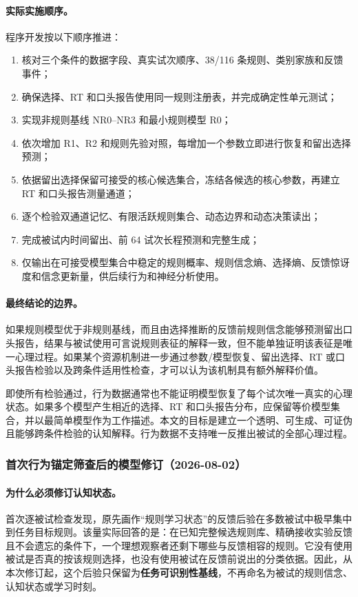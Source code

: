 \paragraph{实际实施顺序。}
程序开发按以下顺序推进：
\begin{enumerate}
    \item 核对三个条件的数据字段、真实试次顺序、38/116 条规则、类别家族和反馈事件；
    \item 确保选择、RT 和口头报告使用同一规则注册表，并完成确定性单元测试；
    \item 实现非规则基线 NR0--NR3 和最小规则模型 R0；
    \item 依次增加 R1、R2 和规则先验对照，每增加一个参数立即进行恢复和留出选择预测；
    \item 依据留出选择保留可接受的核心候选集合，冻结各候选的核心参数，再建立 RT 和口头报告测量通道；
    \item 逐个检验双通道记忆、有限活跃规则集合、动态边界和动态决策读出；
    \item 完成被试内时间留出、前 64 试次长程预测和完整生成；
    \item 仅输出在可接受模型集合中稳定的规则概率、规则信念熵、选择熵、反馈惊讶度和信念更新量，供后续行为和神经分析使用。
\end{enumerate}

\paragraph{最终结论的边界。}
如果规则模型优于非规则基线，而且由选择推断的反馈前规则信念能够预测留出口头报告，结果与被试使用可言说规则表征的解释一致，但不能单独证明该表征是唯一心理过程。如果某个资源机制进一步通过参数/模型恢复、留出选择、RT 或口头报告检验以及跨条件适用性检查，才可以认为该机制具有额外解释价值。

即使所有检验通过，行为数据通常也不能证明模型恢复了每个试次唯一真实的心理状态。如果多个模型产生相近的选择、RT 和口头报告分布，应保留等价模型集合，并以最简单模型作为工作描述。本文的目标是建立一个透明、可生成、可证伪且能够跨条件检验的认知解释。行为数据不支持唯一反推出被试的全部心理过程。


\subsubsection{首次行为锚定筛查后的模型修订（2026-08-02）}

\paragraph{为什么必须修订认知状态。}
首次逐被试检查发现，原先画作“规则学习状态”的反馈后验在多数被试中极早集中到任务目标规则。该量实际回答的是：在已知完整候选规则库、精确接收实验反馈且不会遗忘的条件下，一个理想观察者还剩下哪些与反馈相容的规则。它没有使用被试是否真的按该规则选择，也没有使用被试在反馈前说出的分类依据。因此，从本次修订起，这个后验只保留为\textbf{任务可识别性基线}，不再命名为被试的规则信念、认知状态或学习时刻。


